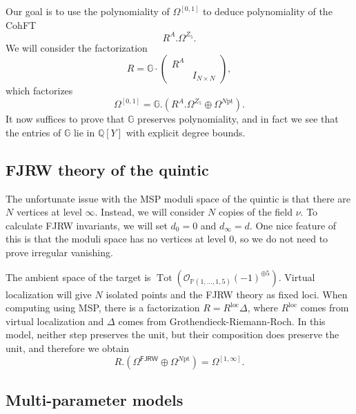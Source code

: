 \documentclass[10pt]{amsart}
\theoremstyle{definition}
\theoremstyle{remark}
\theoremstyle{plain}
\theoremstyle{definition}
\theoremstyle{remark}
\newcommand{\G}{\mathbb{G}}
\newcommand{\Q}{\mathbb{Q}}
\renewcommand{\P}{\mathbb{P}}
\newcommand{\mc}[1]{\mathcal{#1}}
\newcommand{\mr}[1]{\mathrm{#1}}
\newcommand{\on}[1]{\operatorname{#1}}
\newcommand{\ms}[1]{\mathsf{#1}}
\newcommand{\1}{\mathbf{1}}
\newcommand{\2}{\mathbf{2}}
\newcommand{\3}{\mathbf{3}}
\newcommand{\pt}{\mr{pt}}
\newcommand{\FJRW}{\ms{FJRW}}
\begin{document}
Our goal is to use the polynomiality of $\Omega^{[0,1]}$ to deduce polynomiality of the CohFT
\[ R^A . \Omega^{Z_5}. \]
We will consider the factorization
\[ R = \G \cdot \begin{pmatrix}
    R^A & \\
    & I_{N \times N}
\end{pmatrix}, \]
which factorizes
\[ \Omega^{[0,1]} = \G . (R^A . \Omega^{Z_5} \oplus \Omega^{N\pt}). \]
It now suffices to prove that $\G$ preserves polynomiality, and in fact we see that the entries of $\G$ lie in $\Q[Y]$ with explicit degree bounds.

\subsection{FJRW theory of the quintic}%
\label{sub:FJRW theory of the quintic}

The unfortunate issue with the MSP moduli space of the quintic is that there are $N$ vertices at level $\infty$. Instead, we will consider $N$ copies of the field $\nu$. To calculate FJRW invariants, we will set $d_0 = 0$ and $d_{\infty} = d$. One nice feature of this is that the moduli space has no vertices at level $0$, so we do not need to prove irregular vanishing.

The ambient space of the target is
$\on{Tot}(\mc{O}_{\P(1,\ldots, 1,5)}(-1)^{\oplus 5})$. 
Virtual localization will give $N$ isolated points and the FJRW theory as fixed loci. When computing using MSP, there is a factorization $R = R^{\on{loc}} \Delta$, where $R^{\on{loc}}$ comes from virtual localization and $\Delta$ comes from Grothendieck-Riemann-Roch. In this model, neither step preserves the unit, but their composition does preserve the unit, and therefore we obtain
\[ R.(\Omega^{\FJRW} \oplus \Omega^{N\pt}) = \Omega^{[1,\infty]}. \]

\subsection{Multi-parameter models}%
\label{sub:Multi-parameter models}
\end{document}
